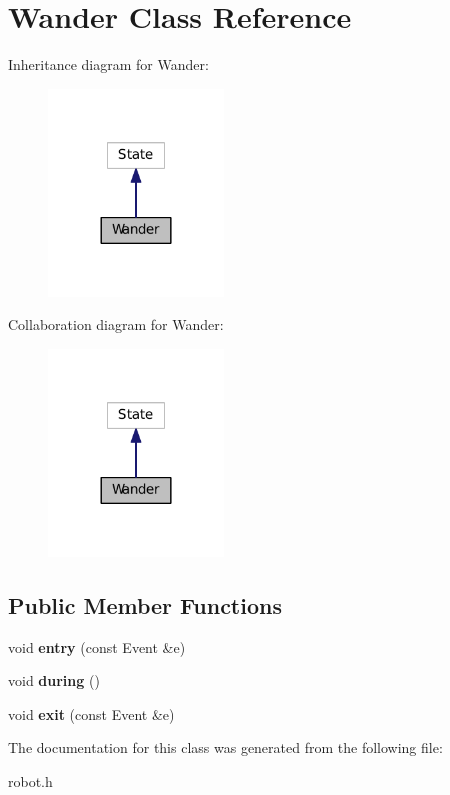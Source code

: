\hypertarget{classWander}{\section{Wander Class Reference}
\label{classWander}
}


Inheritance diagram for Wander\+:
\nopagebreak
\begin{figure}[H]
\begin{center}
\leavevmode
\includegraphics[width=132pt]{classWander__inherit__graph}
\end{center}
\end{figure}


Collaboration diagram for Wander\+:
\nopagebreak
\begin{figure}[H]
\begin{center}
\leavevmode
\includegraphics[width=132pt]{classWander__coll__graph}
\end{center}
\end{figure}
\subsection*{Public Member Functions}
\begin{DoxyCompactItemize}
\item 
\hypertarget{classWander_a977a4089a2767ad5b6674f18b3a28838}{void {\bfseries entry} (const Event \&e)}\label{classWander_a977a4089a2767ad5b6674f18b3a28838}

\item 
\hypertarget{classWander_ae2cd859893ca9b40313e25440c83787a}{void {\bfseries during} ()}\label{classWander_ae2cd859893ca9b40313e25440c83787a}

\item 
\hypertarget{classWander_a7b8cbd71ac448d7228d6bd4716fca720}{void {\bfseries exit} (const Event \&e)}\label{classWander_a7b8cbd71ac448d7228d6bd4716fca720}

\end{DoxyCompactItemize}


The documentation for this class was generated from the following file\+:\begin{DoxyCompactItemize}
\item 
robot.\+h\end{DoxyCompactItemize}
